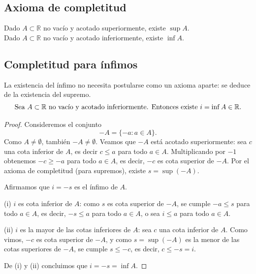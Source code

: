 \subsection{Axioma de completitud}
Dado $A \subset\mathbb{R}$ no vacío y acotado superiormente, existe $\sup A$.\\
Dado $A \subset\mathbb{R}$ no vacío y acotado inferiormente, existe $\inf A$.

\subsection{Completitud para ínfimos}
La existencia del ínfimo no necesita postularse como un axioma aparte: se deduce
de la existencia del supremo.
\[
\text{Sea } A \subset \mathbb{R} \text{ no vacío y acotado inferiormente. Entonces existe } i = \inf A \in \mathbb{R}.
\]
\begin{proof}
Consideremos el conjunto
\[
-A = \{-a : a \in A\}.
\]
Como $A \neq \emptyset$, también $-A \neq \emptyset$. Veamos que $-A$ está acotado
superiormente: sea $c$ una cota inferior de $A$, es decir $c \le a$ para todo
$a \in A$. Multiplicando por $-1$ obtenemos $-c \ge -a$ para todo $a \in A$, es
decir, $-c$ es cota superior de $-A$. Por el axioma de completitud (para
supremos), existe $s = \sup(-A)$.

Afirmamos que $i = -s$ es el ínfimo de $A$.

(i) $i$ es cota inferior de $A$: como $s$ es cota superior de $-A$, se cumple
$-a \le s$ para todo $a \in A$, es decir, $-s \le a$ para todo $a \in A$, o sea
$i \le a$ para todo $a \in A$.

(ii) $i$ es la mayor de las cotas inferiores de $A$: sea $c$ una cota inferior
de $A$. Como vimos, $-c$ es cota superior de $-A$, y como $s = \sup(-A)$ es la
menor de las cotas superiores de $-A$, se cumple $s \le -c$, es decir,
$c \le -s = i$.

De (i) y (ii) concluimos que $i = -s = \inf A$.
\end{proof}

